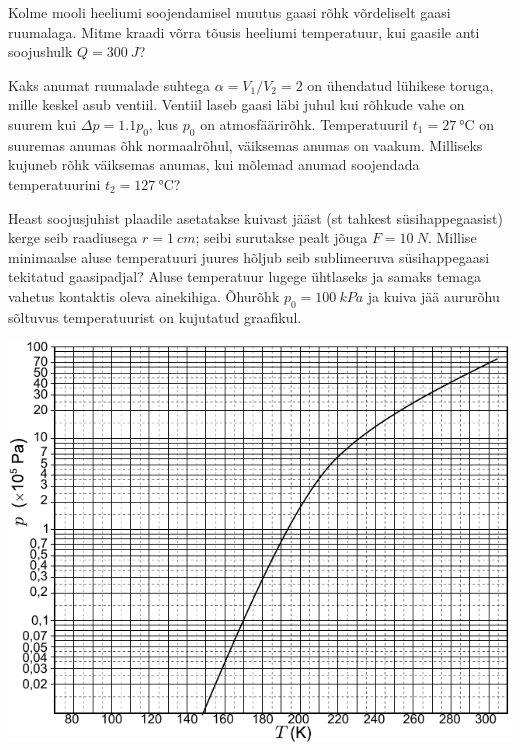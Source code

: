 \documentclass[10pt, twoside]{article}
\begin{document}
{
Kolme mooli heeliumi soojendamisel muutus gaasi rõhk võrdeliselt gaasi ruumalaga. Mitme kraadi võrra tõusis heeliumi temperatuur, kui gaasile anti soojushulk $Q = \SI{300}{J}$?
\probend
\bigskip


Kaks anumat ruumalade suhtega $\alpha = V_1/V_2 = 2$ on ühendatud lühikese toruga, mille keskel asub ventiil. Ventiil laseb gaasi läbi juhul kui rõhkude vahe on suurem kui $\Delta p = \num{1,1}p_0$, kus $p_0$ on atmosfäärirõhk. Temperatuuril $t_1 = \SI{27}{\degreeCelsius}$ on suuremas anumas õhk normaalrõhul, väiksemas anumas on vaakum. Milliseks kujuneb rõhk väiksemas anumas, kui mõlemad anumad soojendada temperatuurini $t_2 = \SI{127}{\degreeCelsius}$?
\probend
\bigskip


Heast soojusjuhist plaadile asetatakse kuivast jääst (st tahkest
süsihappegaasist) kerge seib raadiusega $r=\SI{1}{cm}$; seibi surutakse
pealt jõuga $F=\SI{10}{N}$. Millise minimaalse aluse
temperatuuri juures hõljub seib sublimeeruva süsihappegaasi tekitatud
gaasipadjal? Aluse temperatuur lugege ühtlaseks ja samaks temaga
vahetus kontaktis oleva ainekihiga. Õhurõhk $p_{0}=\SI{100}{kPa}$
ja kuiva jää aururõhu sõltuvus temperatuurist on kujutatud graafikul.

\begin{center}
	\includegraphics{2010-v3g-06-Aururohk}
\end{center}
\probend
\bigskip

}
\end{document}
